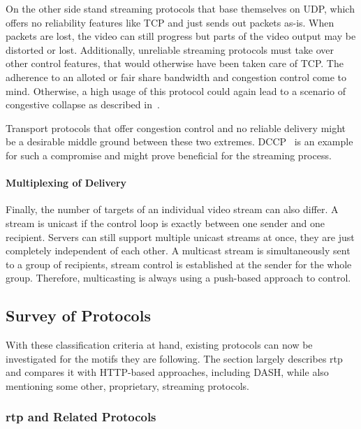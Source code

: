 On the other side stand streaming protocols that base themselves on \gls{UDP}, which offers no reliability features like \gls{TCP} and just sends out packets as-is. When packets are lost, the video can still progress but parts of the video output may be distorted or lost. Additionally, unreliable streaming protocols must take over other control features, that would otherwise have been taken care of \gls{TCP}. The adherence to an alloted or fair share bandwidth and congestion control come to mind. Otherwise, a high usage of this protocol could again lead to a scenario of congestive collapse as described in~\cite{rfc896}.

Transport protocols that offer congestion control and no reliable delivery might be a desirable middle ground between these two extremes. \gls{DCCP}~\cite{kohler2006designing} is an example for such a compromise and might prove beneficial for the streaming process.


\paragraph{Multiplexing of Delivery}
Finally, the number of targets of an individual video stream can also differ. A stream is unicast if the control loop is exactly between one sender and one recipient. Servers can still support multiple unicast streams at once, they are just completely independent of each other. A multicast stream is simultaneously sent to a group of recipients, stream control is established at the sender for the whole group. Therefore, multicasting is always using a push-based approach to control.


\subsection{Survey of Protocols}

With these classification criteria at hand, existing protocols can now be investigated for the motifs they are following. The section largely describes \gls{rtp} and compares it with \gls{HTTP}-based approaches, including \gls{DASH}, while also mentioning some other, proprietary, streaming protocols.


\subsubsection{\texorpdfstring{\acrshort{rtp}}{rtp} and Related Protocols}

